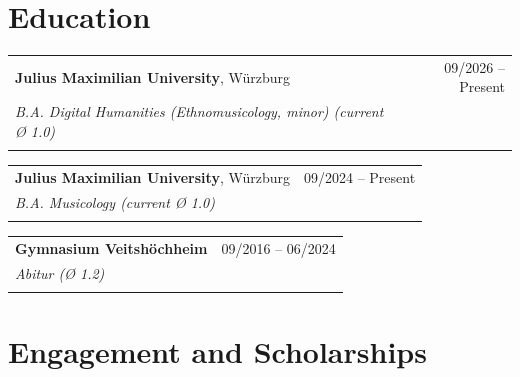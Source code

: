 \documentclass[11pt,a4paper]{article}
\begin{document}
\section{Education}
\begin{tabularx}{\textwidth}{X r}
\textbf{Julius Maximilian University}, Würzburg & 09/2026 -- Present \\
\textit{B.A. Digital Humanities (Ethnomusicology, minor) (current Ø 1.0)} & \\\\
\end{tabularx}
\begin{tabularx}{\textwidth}{X r}
\textbf{Julius Maximilian University}, Würzburg & 09/2024 -- Present \\
\textit{B.A. Musicology (current Ø 1.0)} & \\\\
\end{tabularx}
\begin{tabularx}{\textwidth}{X r}
\textbf{Gymnasium Veitshöchheim} & 09/2016 -- 06/2024 \\
\textit{Abitur (Ø 1.2)} & \\\\
\end{tabularx}

\section{Engagement and Scholarships}
\end{document}
